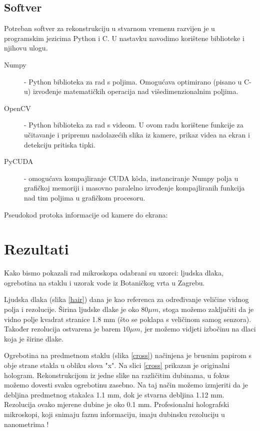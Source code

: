 \documentclass[hidelinks]{ferseminar}
\begin{document}
\subsection{Softver}
Potreban softver za rekonstrukciju u stvarnom vremenu razvijen je u programskim jezicima Python i C. U nastavku navodimo korištene biblioteke i njihovu ulogu.
\begin{description}
	\item[Numpy] - Python biblioteka za rad s poljima. Omogućava optimirano (pisano u C-u) izvođenje matematičkih operacija nad višedimenzionalnim poljima.
	\item[OpenCV] - Python biblioteka za rad s videom. U ovom radu korištene funkcije za učitavanje i pripremu nadolazećih slika iz kamere, prikaz videa na ekran i detekciju pritiska tipki.
	\item[PyCUDA] - omogućava kompajliranje CUDA k\^oda, instanciranje Numpy polja u grafičkoj memoriji i masovno paralelno izvođenje kompajliranih funkcija nad tim poljima u grafičkom procesoru.
\end{description}
Pseudokod protoka informacije od kamere do ekrana:



\section{Rezultati}
Kako bismo pokazali rad mikroskopa odabrani su uzorci: ljudska dlaka, ogrebotina na staklu i uzorak vode iz Botaničkog vrta u Zagrebu.

Ljudska dlaka (slika \ref{hair}) dana je kao referenca za određivanje veličine vidnog polja i rezolucije. Širina ljudske dlake je oko $80 \mu{m}$, stoga možemo zaključiti da je vidno polje kvadrat stranice 1.8 mm (što se poklapa s veličinom samog senzora). Također rezolucija ostvarena je barem $10 \mu{m}$, jer možemo vidjeti izbočinu na dlaci koja je  širine dlake.

Ogrebotina na predmetnom staklu (slika \ref{cross}) načinjena je brusnim papirom s obje strane stakla u obliku slova "x". Na slici \ref{cross} prikazan je originalni hologram. Rekonstrukcijom iz jedne slike na različitim dubinama, u fokus možemo dovesti svaku ogrebotinu zasebno. Na taj način možemo izmjeriti da je debljina predmetnog stakalca 1.1 mm, dok je stvarna debljina 1.12 mm. Rezolucija ovako mjerene dubine je oko 0.1 mm. Profesionalni holografski mikroskopi, koji snimaju faznu informaciju, imaju dubinsku rezoluciju u nanometrima \cite{kemper2008digital}!
\end{document}
